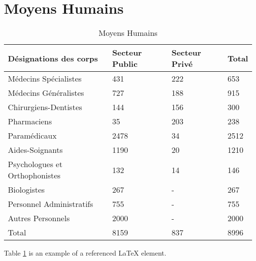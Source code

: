 \newpage
\section{Moyens Humains}
\begin{table}[h!]
\begin{center}
\begin{tabular}{|p{6cm}|p{3cm}|p{3cm}|p{1cm}|}
\hline
Désignations des corps	       &Secteur Public	&Secteur Privé	&Total\\
\hline
Médecins Spécialistes	         &431	            &222	          &653\\
Médecins Généralistes	         &727	            &188	          &915\\
Chirurgiens-Dentistes	         &144	            &156	          &300\\
Pharmaciens	                   &35	            &203	          &238\\
Paramédicaux	                 &2478	          &34	            &2512\\
Aides-Soignants	               &1190	          &20	            &1210\\
Psychologues et Orthophonistes &132	            &14	            &146\\
Biologistes	                   &267	            &-	            &267\\
Personnel Administratifs	     &755	            &-	            &755\\
Autres Personnels	             &2000	          &-	            &2000\\
\hline
Total	                         &8159	          &837	          &8996\\
\hline
\end{tabular}
\end{center}
\caption{Moyens Humains}
\label{table:5}
\end{table}
Table \ref{table:5} is an example of a referenced \LaTeX{} element.
